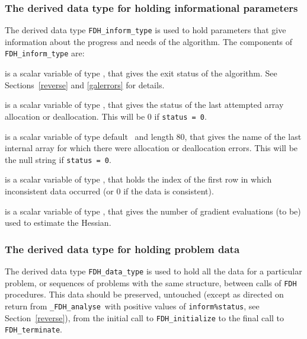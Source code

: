 \documentclass{galahad}
\newcommand{\packagename}{FDH}
\newcommand{\fullpackagename}{\libraryname\_\packagename}
\newcommand{\solver}{{\tt \fullpackagename\_analyse}}
\begin{document}

\subsubsection{The derived data type for holding informational
 parameters}\label{typeinform}
The derived data type 
{\tt \packagename\_inform\_type} 
is used to hold parameters that give information about the progress and needs 
of the algorithm. The components of 
{\tt \packagename\_inform\_type} 
are:

\begin{description}
 is a scalar variable of type \integer, that gives the
exit status of the algorithm. 
See Sections~\ref{reverse} and \ref{galerrors}
for details.

 is a scalar variable of type \integer, that gives
the status of the last attempted array allocation or deallocation.
This will be 0 if {\tt status = 0}.

 is a scalar variable of type default \character\
and length 80, that  gives the name of the last internal array 
for which there were allocation or deallocation errors.
This will be the null string if {\tt status = 0}. 

 is a scalar variable of type \integer, that holds the 
index of the first row in which inconsistent data occurred (or 0 if the data is 
consistent).

 is a scalar variable of type \integer, that gives the
number of gradient evaluations (to be) used to estimate the Hessian.

\end{description}


\subsubsection{The derived data type for holding problem data}\label{typedata}
The derived data type 
{\tt \packagename\_data\_type} 
is used to hold all the data for a particular problem,
or sequences of problems with the same structure, between calls of 
{\tt \packagename} procedures. 
This data should be preserved, untouched (except as directed on
return from \solver\ with positive values of {\tt inform\%status}, see
Section~\ref{reverse}),
from the initial call to 
{\tt \packagename\_initialize}
to the final call to
{\tt \packagename\_terminate}.
\end{document}
